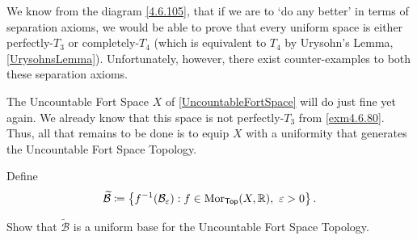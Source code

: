 We know from the diagram \eqref{4.6.105}, that if we are to `do any better' in terms of separation axioms, we would be able to prove that every uniform space is either perfectly-$T_3$ or completely-$T_4$ (which is equivalent to $T_4$ by Urysohn's Lemma, \cref{UrysohnsLemma}).  Unfortunately, however, there exist counter-examples to both these separation axioms.
\begin{exm}\label{exm4.4.20}
The Uncountable Fort Space $X$ of \cref{UncountableFortSpace} will do just fine yet again.  We already know that this space is not perfectly-$T_3$ from \cref{exm4.6.80}.  Thus, all that remains to be done is to equip $X$ with a uniformity that generates the Uncountable Fort Space Topology.

Define
\begin{equation}
\widetilde{\mathcal{B}}\coloneqq \left\{ f^{-1}(\mathcal{B}_{\varepsilon}):f\in \Mor _{\Top}(X,\R ),\ \varepsilon >0\right\} .
\end{equation}
\begin{exr}
Show that $\widetilde{\mathcal{B}}$ is a uniform base for the Uncountable Fort Space Topology.
\end{exr}
\end{exm}
